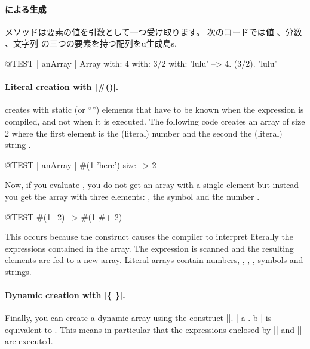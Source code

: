 \documentclass[a4paper,10pt,twoside]{book}
\begin{document}
\paragraph{ による生成}  メソッドは要素の値を引数として一つ受け取ります。
次のコードでは値 、分数 、文字列  の三つの要素を持つ配列をu生成島s.

\begin{code}{@TEST | anArray |}
Array with: 4 with: 3/2 with: 'lulu' -->  {4. (3/2). 'lulu'}
\end{code}

\paragraph{Literal creation with \ct|\#()|.}
\ct{#()} creates  with static (or ``'') elements that have to be known when the expression is compiled, and not when it is executed. The following code creates an array of size 2 where the first element is the (literal) number  and the second the (literal) string .


\begin{code}{@TEST | anArray |}
#(1 'here') size --> 2
\end{code}

Now, if you evaluate , you do not get an array with a single element  but instead you get the array  \ie with three elements: , the symbol \ct{#+} and the number .

\begin{code}{@TEST}
#(1+2) -->  #(1 #+ 2)
\end{code}

\noindent
This occurs because the construct \ct{#()} causes the compiler to interpret literally the expressions contained in the array. The expression is scanned and the resulting elements are fed to a new array. Literal arrays contain numbers, , , , symbols and strings.

\paragraph{Dynamic creation with \ct|\{ \}|.}
Finally, you can create a dynamic array using the construct \ct|{}|. \ct|{ a . b }| is equivalent to . This means in particular that the expressions enclosed by \ct|{| and \ct|}| are executed. 
\end{document}
